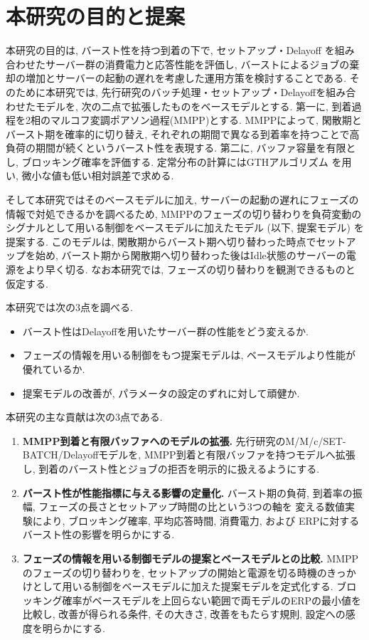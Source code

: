 \documentclass[a4paper, 11pt, dvipdfmx]{jsreport}
\begin{document}
\section{本研究の目的と提案}
\label{sec:proposal}
本研究の目的は, バースト性を持つ到着の下で, セットアップ・Delayoff
を組み合わせたサーバー群の消費電力と応答性能を評価し, バーストによるジョブの棄却の増加とサーバーの起動の遅れを考慮した運用方策を検討することである. 
そのために本研究では, 先行研究\cite{LeAnh2025}のバッチ処理・セットアップ・Delayoffを組み合わせたモデルを, 次の二点で拡張したものをベースモデルとする. 第一に, 到着過程を2相のマルコフ変調ポアソン過程(MMPP)とする. MMPPによって, 閑散期とバースト期を確率的に切り替え, それぞれの期間で異なる到着率を持つことで高負荷の期間が続くというバースト性を表現する. 第二に, バッファ容量を有限とし, ブロッキング確率を評価する. 定常分布の計算にはGTHアルゴリズム
\cite{GrassmannTaksarHeyman1985}を用い, 微小な値も低い相対誤差で求める. 

そして本研究ではそのベースモデルに加え, サーバーの起動の遅れにフェーズの情報で対処できるかを調べるため, MMPPのフェーズの切り替わりを負荷変動のシグナルとして用いる制御をベースモデルに加えたモデル (以下, 提案モデル) を提案する. このモデルは, 閑散期からバースト期へ切り替わった時点でセットアップを始め, バースト期から閑散期へ切り替わった後はIdle状態のサーバーの電源をより早く切る. 
なお本研究では, フェーズの切り替わりを観測できるものと仮定する. 

本研究では次の3点を調べる. 
\begin{itemize}
    \item バースト性はDelayoffを用いたサーバー群の性能をどう変えるか. 
    \item フェーズの情報を用いる制御をもつ提案モデルは, ベースモデルより性能が優れているか. 
    \item 提案モデルの改善が, パラメータの設定のずれに対して頑健か. 
\end{itemize}

本研究の主な貢献は次の3点である. 
\begin{enumerate}
    \item \textbf{MMPP到着と有限バッファへのモデルの拡張.}
        先行研究\cite{LeAnh2025}のM/M/c/SET-BATCH/Delayoffモデルを, MMPP到着と有限バッファを持つモデルへ拡張し, 到着のバースト性とジョブの拒否を明示的に扱えるようにする. 
    \item \textbf{バースト性が性能指標に与える影響の定量化.}
        バースト期の負荷, 到着率の振幅, フェーズの長さとセットアップ時間の比という3つの軸を
        変える数値実験により, ブロッキング確率, 平均応答時間, 消費電力, および
        ERPに対するバースト性の影響を明らかにする. 
    \item \textbf{フェーズの情報を用いる制御モデルの提案とベースモデルとの比較.}
        MMPPのフェーズの切り替わりを, セットアップの開始と電源を切る時機のきっかけとして用いる制御をベースモデルに加えた提案モデルを定式化する. ブロッキング確率がベースモデルを上回らない範囲で両モデルのERPの最小値を比較し, 改善が得られる条件, その大きさ, 改善をもたらす規則, 設定への感度を明らかにする. 
\end{enumerate}
\end{document}
